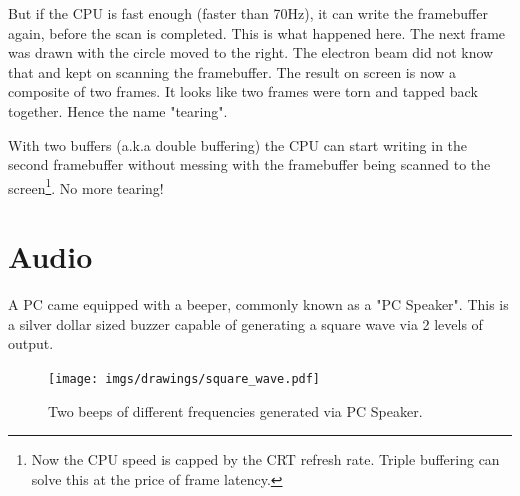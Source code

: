 \documentclass[book.tex]{subfiles}
\begin{document}
\par
But if the CPU is fast enough (faster than 70Hz), it can write the framebuffer again, before the scan is completed. This is what happened here. The next frame was drawn with the circle moved to the right. The electron beam did not know that and kept on scanning the framebuffer. The result on screen is now a composite of two frames. It looks like two frames were torn and tapped back together. Hence the name "tearing".\\
\par
With two buffers (a.k.a double buffering) the CPU can start writing in the second framebuffer without messing with the framebuffer being scanned to the screen\footnote{Now the CPU speed is capped by the CRT refresh rate. Triple buffering can solve this at the price of frame latency.}. No more tearing!
















\section{Audio}
A PC came equipped with a beeper, commonly known as a "PC Speaker". This is a silver dollar sized buzzer capable of generating a square wave via 2 levels of output.\\
\par
 \begin{figure}[H]
\centering
\texttt{[image: imgs/drawings/square\_wave.pdf]}
\caption{Two beeps of different frequencies generated via PC Speaker.}
\end{figure}
\end{document}
